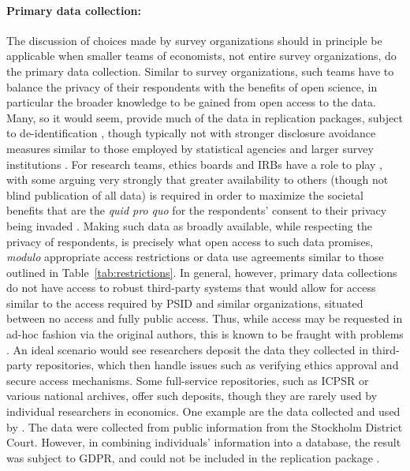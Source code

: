\documentclass{article}
\begin{document}
\paragraph{Primary data collection:} The discussion of choices made by survey organizations should in principle be applicable when smaller teams of economists, not entire survey organizations, do the primary data collection. Similar to survey organizations, such teams have to balance the privacy of their respondents with the benefits of open science, in particular the broader knowledge to be gained from open access to the data. Many, so it would seem, provide much of the data in replication packages, subject  to de-identification \citep[see ][ for examples]{kopper_j-pal_2020,bjarkefur_development_2021}, though typically not with stronger disclosure avoidance measures similar to those employed by statistical agencies and larger survey institutions \citep[for a brief discussion of the issues and one possible solution, see ][]{mukherjee_assessing_2023}. For research teams, ethics boards and \acp{IRB} have a role to play \citep{grant_opinion_2019}, with some arguing very strongly that greater availability to others (though not blind publication of all data) is required in order to maximize the societal benefits that are the \textit{quid pro quo} for the respondents' consent to their privacy being invaded \citep{meyer_practical_2018,grant_opinion_2019}. Making such data as broadly available, while respecting the privacy of respondents, is precisely what open access to such data promises, \textit{modulo} appropriate access restrictions or data use agreements similar to those outlined in Table~\ref{tab:restrictions}. In general, however, primary data collections do not have access to robust third-party systems that would allow for access similar to the access required by PSID and similar organizations, situated between no access and fully public access. Thus, while access may be requested in ad-hoc fashion via the original authors, this is known to be fraught with problems \citep{watson_many_2022,gabelica_many_2022}. An ideal scenario would see researchers deposit the data they collected in third-party repositories, which then handle issues such as verifying ethics approval and secure access mechanisms. Some full-service repositories, such as \ac{ICPSR} or various national archives, offer such deposits, though they are rarely used by individual researchers in economics.
%
One example are the data collected and used by \citet{ahrsjo_identity_2024}. The data were collected from public information from the Stockholm District Court. However, in combining individuals' information into a database, the result was subject to \ac{GDPR}, and could not be included in the replication package \citep{ahrsjo_code_2024}. 
\end{document}
